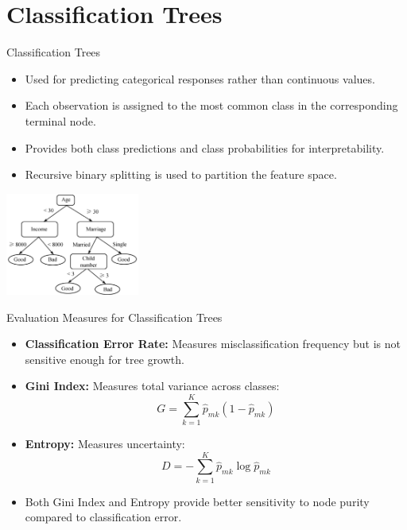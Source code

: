 \documentclass[aspectratio=169,xcolor=dvipsnames]{beamer}
\begin{document}
\section{Classification Trees}
\begin{frame}{Classification Trees}
    \begin{itemize}
        \item Used for predicting categorical responses rather than continuous values.
        \item Each observation is assigned to the most common class in the corresponding terminal node.
        \item Provides both class predictions and class probabilities for interpretability.
        \item Recursive binary splitting is used to partition the feature space.
    \end{itemize}
    \centering
    \includegraphics[width=0.33\textwidth]{images/class_tree.png}
\end{frame}

\begin{frame}{Evaluation Measures for Classification Trees}
    \begin{itemize}
        \item \textbf{Classification Error Rate:} Measures misclassification frequency but is not sensitive enough for tree growth.
        \item \textbf{Gini Index:} Measures total variance across classes:
        \begin{equation}
            G = \sum_{k=1}^{K} \hat{p}_{mk} (1 - \hat{p}_{mk})
        \end{equation}
        \item \textbf{Entropy:} Measures uncertainty:
        \begin{equation}
            D = -\sum_{k=1}^{K} \hat{p}_{mk} \log \hat{p}_{mk}
        \end{equation}
        \item Both Gini Index and Entropy provide better sensitivity to node purity compared to classification error.
    \end{itemize}
\end{frame}
\end{document}
